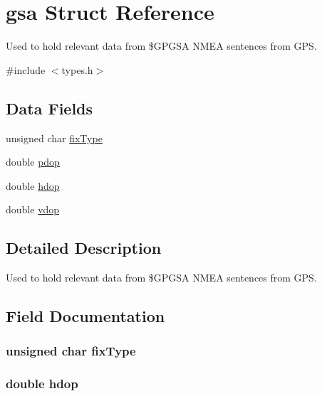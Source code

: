 \hypertarget{structgsa}{}\section{gsa Struct Reference}
\label{structgsa}


Used to hold relevant data from \$\+G\+P\+G\+SA N\+M\+EA sentences from G\+PS.  




{\ttfamily \#include $<$types.\+h$>$}

\subsection*{Data Fields}
\begin{DoxyCompactItemize}
\item 
unsigned char \hyperlink{structgsa_a4217a0a41f1bf0012de0dd9daa1b8dfc}{fix\+Type}
\item 
double \hyperlink{structgsa_a387b6cbd184865365f92d29fd1ac32c1}{pdop}
\item 
double \hyperlink{structgsa_a7ede759392ed439219bdbac4c8ede827}{hdop}
\item 
double \hyperlink{structgsa_a4001a0f05d0c57ebdb066d738098bff7}{vdop}
\end{DoxyCompactItemize}


\subsection{Detailed Description}
Used to hold relevant data from \$\+G\+P\+G\+SA N\+M\+EA sentences from G\+PS. 

\subsection{Field Documentation}
\subsubsection[{\texorpdfstring{fix\+Type}{fixType}}]{\setlength{\rightskip}{0pt plus 5cm}unsigned char fix\+Type}\hypertarget{structgsa_a4217a0a41f1bf0012de0dd9daa1b8dfc}{}\label{structgsa_a4217a0a41f1bf0012de0dd9daa1b8dfc}
\subsubsection[{\texorpdfstring{hdop}{hdop}}]{\setlength{\rightskip}{0pt plus 5cm}double hdop}\hypertarget{structgsa_a7ede759392ed439219bdbac4c8ede827}{}\label{structgsa_a7ede759392ed439219bdbac4c8ede827}
